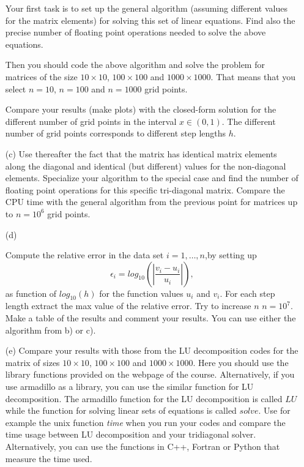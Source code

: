 \begin{enumerate}
Your first task is to set up the general algorithm (assuming different values for the matrix elements) for solving this set of linear equations.
Find also the precise number of floating point 
operations needed to solve the above equations. 


Then you should code the above algorithm and solve the problem for matrices of the size
$10\times 10$, $100\times 100$ and $1000\times 1000$.  That means that you select $n=10$, $n=100$ and
$n=1000$ grid points. 

Compare your results (make plots) with the closed-form solution for the different number of grid points  in the 
interval $x\in(0,1)$.  The different number of grid points corresponds to different step lengths $h$.

\item[(c)] Use thereafter the fact that the matrix has identical matrix elements along the diagonal and identical (but different) values for the non-diagonal elements. Specialize your algorithm to the special case and find the number of floating point operations 
for this specific tri-diagonal matrix. Compare the CPU time with the general algorithm from the previous point for matrices up to  $n=10^6$ grid points. 

\item[(d)]

Compute the relative error  in the data set $i=1,\dots, n$,by setting up 
\[
   \epsilon_i=log_{10}\left(\left|\frac{v_i-u_i}
                 {u_i}\right|\right),
\]
as function of $log_{10}(h)$ for the function values $u_i$ and $v_i$.
For each step length extract the max value of the relative error.  
Try to increase $n$ $n=10^7$.  Make a table of the results and 
comment your results. You can use either the algorithm from b) or c). 

\item[(e)]
Compare your results with those from the LU decomposition codes for the matrix of sizes $10\times 10$, $100\times 100$ and
$1000\times 1000$. Here you should use the library functions provided  on the webpage of the course. Alternatively, if you use armadillo as a library, you can use the similar function for LU decomposition.  The armadillo function for the LU decomposition is called $LU$ while the function for solving linear sets of equations is called $solve$.
Use for example the unix function {\em time} when you run your codes 
and compare the time usage between LU decomposition and  your
tridiagonal solver.   Alternatively, you can use the functions in C++, Fortran or Python that measure the time used. 


\end{enumerate}
